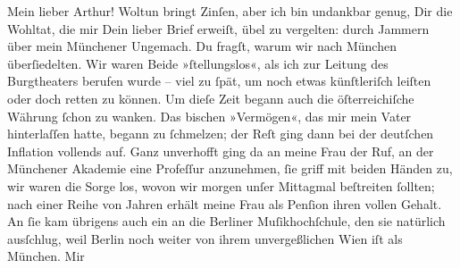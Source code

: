 \pstart{}Mein lieber Arthur!\pend\vspace{0.5em}
\pstart
           Woltun bringt Zinſen, aber ich bin undankbar genug, Dir die Wohltat, die mir Dein
               lieber Brief erweiſt, übel zu vergelten: durch Jammern über mein Münchener Ungemach. Du fragſt, warum wir nach München überſiedelten. Wir waren Beide »ſtellungslos«, als ich zur Leitung
               des Burgtheaters berufen wurde – viel zu{ }ſpät, um
               noch etwas künſtleriſch leiſten oder doch retten zu können. Um dieſe Zeit begann auch
               die öſterreichiſche Währung{ }ſchon zu wanken.
               Das bischen »Vermögen«, das mir mein Vater hinterlaſſen hatte, begann zu{ }ſchmelzen; der Reſt
               ging dann bei der deutſchen Inflation vollends
               auf. Ganz unverhofft ging da an meine Frau der Ruf, an der Münchener Akademie eine Profeſſur anzunehmen,{ }ſie griff mit beiden Händen
               zu, wir waren die Sorge los, wovon wir morgen unſer Mittagmal {\pb}beſtreiten{ }ſollten; nach einer Reihe von Jahren
               erhält meine Frau als
               Penſion ihren vollen Gehalt. An{ }ſie kam übrigens auch ein \label{K_L02534-1v}\label{K_L02534-1} an die Berliner
                  Muſikhochſchule, den sie natürlich ausſchlug, weil Berlin noch weiter von ihrem unvergeßlichen Wien iſt als München. Mir
